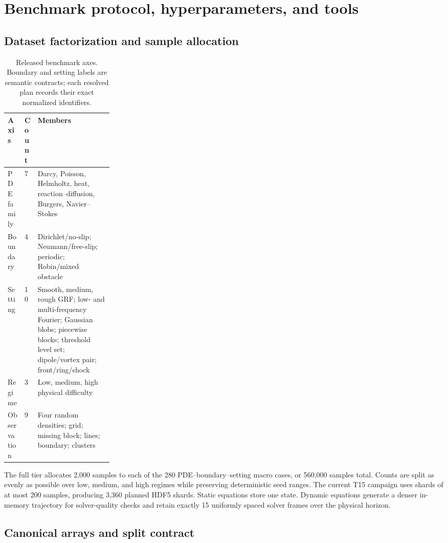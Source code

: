 \documentclass[10pt]{article}
\begin{document}
\section{Benchmark protocol, hyperparameters, and tools}
\label{sec:protocol}

\subsection{Dataset factorization and sample allocation}

\begin{table}[t]
\centering
\caption{Released benchmark axes.  Boundary and setting labels are semantic
contracts; each resolved plan records their exact normalized identifiers.}
\label{tab:factors}
\small
\begin{tabularx}{\linewidth}{@{}p{0.16\linewidth}p{0.08\linewidth}Y@{}}
\toprule
Axis & Count & Members \\
\midrule
PDE family & 7 & Darcy, Poisson, Helmholtz, heat, reaction--diffusion, Burgers, Navier--Stokes \\
Boundary & 4 & Dirichlet/no-slip; Neumann/free-slip; periodic; Robin/mixed obstacle \\
Setting & 10 & Smooth, medium, rough GRF; low- and multi-frequency Fourier; Gaussian blobs; piecewise blocks; threshold level set; dipole/vortex pair; front/ring/shock \\
Regime & 3 & Low, medium, high physical difficulty \\
Observation & 9 & Four random densities; grid; missing block; lines; boundary; clusters \\
\bottomrule
\end{tabularx}
\end{table}

The full tier allocates 2,000 samples to each of the 280 PDE--boundary--setting
macro cases, or 560,000 samples total.  Counts are split as evenly as possible
over low, medium, and high regimes while preserving deterministic seed ranges.
The current T15 campaign uses shards of at most 200 samples, producing 3,360
planned HDF5 shards.  Static equations store one state.  Dynamic equations
generate a denser in-memory trajectory for solver-quality checks and retain
exactly 15 uniformly spaced solver frames over the physical horizon.

\subsection{Canonical arrays and split contract}
\end{document}

